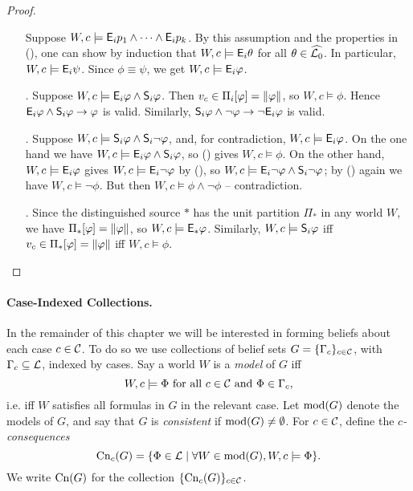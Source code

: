 \begin{proof}
\begin{itemize}
        Suppose $W, c \models \E_i{p_1} \land \cdots \land \E_i{p_k}$. By this
        assumption and the properties in (),
        one can show by induction that $W, c \models \E_i{\theta}$ for all
        $\theta \in \widehat{\lprop}$. In particular, $W, c \models \E_i\psi$.
        Since $\phi \equiv \psi$, we get $W, c \models \E_i\phi$.

    \item[\labelcref{kr_item_e_and_s_implies_phi}.]
        Suppose $W, c \models \E_i\phi \land \S_i\phi$. Then $v_c \in
        \Pi_i[\phi] = \propmods{\phi}$, so $W, c \models \phi$. Hence
        $\E_i\phi \land \S_i\phi \rightarrow \phi$ is valid. Similarly,
        $\S_i\phi \land \neg\phi \rightarrow \neg \E_i\phi$ is valid.

    \item[\labelcref{kr_item_sound_neg_pair}.]
        Suppose $W, c \models \S_i\phi \land \S_i\neg\phi$, and, for
        contradiction, $W, c \models \E_i\phi$. On the one hand we have $W, c
        \models \E_i\phi \land \S_i\phi$, so
        () gives $W, c \models \phi$. On
        the other hand, $W, c \models \E_i\phi$ gives $W, c \models
        \E_i\neg\phi$ by (), so $W, c \models
        \E_i\neg\phi \land \S_i\neg\phi$; by
        () again we have $W, c \models
        \neg\phi$. But then $W, c \models \phi \land \neg\phi$ --
        contradiction.

    \item[\labelcref{kr_item_star_exp}.]
        Since the distinguished source $\ast$ has the unit partition $\Pi_\ast$
        in any world $W$, we have $\Pi_\ast[\phi] = \propmods{\phi}$, so $W, c
        \models \E_\ast\phi$. Similarly, $W, c \models \S_i\phi$ iff $v_c \in
        \Pi_\ast[\phi] = \propmods{\phi}$ iff $W, c \models \phi$.

\end{itemize}
\end{proof}

\paragraph{Case-Indexed Collections.}

In the remainder of this chapter we will be interested in forming beliefs about
each case $c \in \C$. To do so we use collections of belief
sets $G = \{\Gamma_c\}_{c \in \C}$, with $\Gamma_c \subseteq \lext$, indexed by
cases.
%
Say a world $W$ is a \emph{model} of $G$ iff
\[
    W, c \models \Phi \text{ for all } c \in \C \text{ and } \Phi \in \Gamma_c,
\]
i.e. iff $W$ satisfies all formulas in $G$ in the relevant case. Let
$\mods(G)$ denote the models of $G$, and say that $G$ is
\emph{consistent} if $\mods(G) \ne \emptyset$. For $c \in \C$, define the
\emph{$c$-consequences}
\[
    \cn_c(G) = \{\Phi \in \lext \mid \forall W \in \mods(G), W, c \models \Phi\}.
\]
We write $\cn(G)$
for the collection $\{\cn_c(G)\}_{c \in \C}$.

